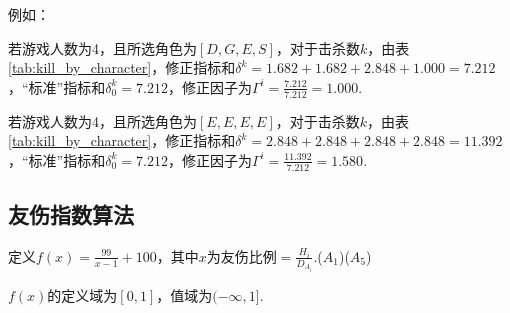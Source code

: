 \documentclass{ctexart}
\begin{document}
例如：

若游戏人数为4，且所选角色为$[D, G, E, S]$，对于击杀数$k$，由表\ref{tab:kill_by_character}，修正指标和$\delta^k = 1.682 + 1.682 + 2.848 + 1.000 = 7.212$，“标准”指标和$\delta_0^k = 7.212$，修正因子为$\Gamma^i = \frac{7.212}{7.212} = 1.000$.

若游戏人数为4，且所选角色为$[E, E, E, E]$，对于击杀数$k$，由表\ref{tab:kill_by_character}，修正指标和$\delta^k = 2.848 + 2.848 + 2.848 + 2.848 = 11.392$，“标准”指标和$\delta_0^k = 7.212$，修正因子为$\Gamma^i = \frac{11.392}{7.212} = 1.580$.

\subsection{友伤指数算法}
\label{sec:f}

定义$f(x) = \frac{99}{x - 1} + 100$，其中$x$为友伤比例$=\frac{H_i}{D_{A_i}}$.($A_1$)($A_5$)

$f(x)$的定义域为$[0, 1]$，值域为$(-\infty, 1]$.
\end{document}
